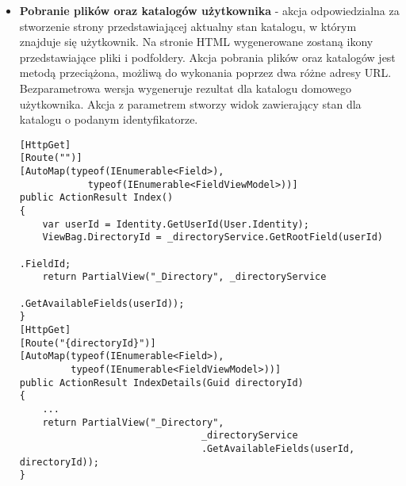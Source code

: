 \begin{itemize}
Implementacja repozytorium zawiera metody wykorzystujące kontekst bazodanowy w celu operacji na danych. Dodanie dodatkowych funkcji do klasy wiąże się z udostępnieniem ich dla wszystkich repozytoriów danych.
Klasa posiada dwa konstruktory - parametrowy i bezparametrowy. Wersja bezparametrowa używana jest na potrzeby testów jednostkowych, zaś parametrowa wykorzystywana jest przez serwisy logiki biznesowej.

\begin{lstlisting}[caption=Metoda usuwania zaimplementowana w repozytorium danych]
public virtual void Delete(object id)
{
	TEntity entityToDelete = dbSet.Find(id);
	Delete(entityToDelete);
}
public virtual void Delete(TEntity entityToDelete)
{
	if(_context.Entry(entityToDelete).State== EntityState.Detached)
	{
		dbSet.Attach(entityToDelete);
	}
	dbSet.Remove(entityToDelete);
}
\end{lstlisting}

W celu odseparowania metod zbędnych dla niektórych repozytoriów zdecydowano się wykorzystać metody rozszerzeń w języku C\#
\begin{lstlisting}[caption=Klasa rozszerzająca metody możliwe do wykonania na repozytorium Katalogów]
public static class DirectoryExtensions
{
	public static IEnumerable<Field> GetFields(
									this Repository<Field> source,
							      Guid directoryId)
	{
		return source.Get(n => n.ParentDirectoryId == directoryId);
	}	
	public static Field GetFieldRoot(this Repository<Field> source,
												 Guid fieldId)
	{
		Field root = source.GetByID(fieldId);
		if (root == null)
		{
			throw new ArgumentException("There is no root folder");
		}           
		return root.ParentDirectoryId.HasValue
			 	 ? GetFieldRoot(source, root.ParentDirectoryId.Value)
			    : root;
	}
\end{lstlisting}
\item \textbf{Pobranie plików oraz katalogów użytkownika} - akcja odpowiedzialna za stworzenie strony przedstawiającej aktualny stan katalogu, w którym znajduje się użytkownik. Na stronie HTML wygenerowane zostaną ikony przedstawiające pliki i podfoldery. Akcja pobrania plików oraz katalogów jest metodą przeciążona, możliwą do wykonania poprzez dwa różne adresy URL. Bezparametrowa wersja wygeneruje rezultat dla katalogu domowego użytkownika. Akcja z parametrem stworzy widok zawierający stan dla katalogu o podanym identyfikatorze.
\begin{lstlisting}[caption=Akcje odpowiedzialne za wyświetlenie plików i katalogów na interfejsie użytkownika]
[HttpGet]
[Route("")]
[AutoMap(typeof(IEnumerable<Field>),
			typeof(IEnumerable<FieldViewModel>))]
public ActionResult Index()
{
	var userId = Identity.GetUserId(User.Identity);
	ViewBag.DirectoryId = _directoryService.GetRootField(userId)
																		.FieldId;
	return PartialView("_Directory", _directoryService
										.GetAvailableFields(userId));
}
[HttpGet]
[Route("{directoryId}")]
[AutoMap(typeof(IEnumerable<Field>),
		 typeof(IEnumerable<FieldViewModel>))]
public ActionResult IndexDetails(Guid directoryId)
{
	...
	return PartialView("_Directory", 
								_directoryService
								.GetAvailableFields(userId, directoryId));
}
\end{lstlisting}


\end{itemize}
